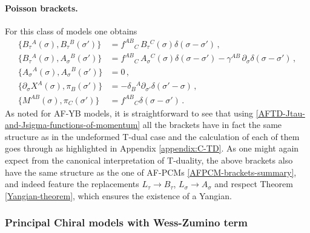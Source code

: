\documentclass[12pt]{article}
\numberwithin{equation}{section}
\begin{document}
\paragraph{Poisson brackets.} For this class of models one obtains
\begin{equation}\label{AFTD-brackets-summary}
\begin{aligned}
\{ B_{\tau}{}^{A}(\sigma),B_{\tau}{}^{B}(\sigma') \} &= f^{AB}{}_{C} \, B_{\tau}{}^{C}(\sigma)\delta(\sigma-\sigma') \, ,
\\
\{ B_{\tau}{}^{A}(\sigma),A_{\sigma}{}^{B}(\sigma') \} &= f^{AB}{}_{C} \, A_{\sigma}{}^{C}(\sigma)\delta(\sigma-\sigma')-\gamma^{AB} \, \partial_{\sigma}\delta(\sigma-\sigma') \, ,
\\
\{ A_{\sigma}{}^{A}(\sigma),A_{\sigma}{}^{B}(\sigma') \} &= 0 \, ,
\\
\{ \partial_{\sigma}X^{A}(\sigma),\pi_{B}(\sigma') \} &= -\delta_{B}{}^{A}\partial_{\sigma'}\delta(\sigma'-\sigma) \, ,
\\
\{ M^{AB}(\sigma),\pi_{C}(\sigma') \} &= f^{AB}{}_{C}\delta(\sigma-\sigma') \, .
\end{aligned}
\end{equation}
As noted for AF-YB models, it is straightforward to see that using \eqref{AFTD-Jtau-and-Jsigma-functions-of-momentum} all the brackets have in fact the same structure as in the undeformed T-dual case and the calculation of each of them goes through as highlighted in Appendix \ref{appendix:C-TD}. As one might again expect from the canonical interpretation of T-duality, the above brackets also have the same structure as the one of AF-PCMs \eqref{AFPCM-brackets-summary}, and indeed feature the replacements $L_{\tau}\rightarrow B_{\tau}$, $L_{\sigma}\rightarrow A_{\sigma}$ and respect Theorem \ref{Yangian-theorem}, which ensures the existence of a Yangian.



\subsubsection{Principal Chiral models with Wess-Zumino term}\label{subsubsec:PCMWZ}
\end{document}
